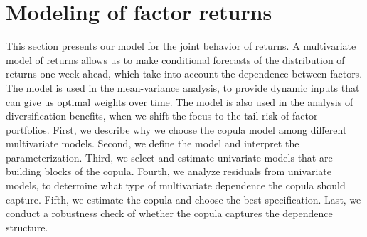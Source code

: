 
\section{Modeling of factor returns} %
\label{sec:modeling_of_factor_returns}

This section presents our model for the joint behavior of returns. A multivariate model of returns allows us to make conditional forecasts of the distribution of returns one week ahead, which take into account the dependence between factors. The model is used in the mean-variance analysis, to provide dynamic inputs that can give us optimal weights over time. The model is also used in the analysis of diversification benefits, when we shift the focus to the tail risk of factor portfolios. First, we describe why we choose the copula model among different multivariate models. Second, we define the model and interpret the parameterization. Third, we select and estimate univariate models that are building blocks of the copula. Fourth, we analyze residuals from univariate models, to determine what type of multivariate dependence the copula should capture. Fifth, we estimate the copula and choose the best specification. Last, we conduct a robustness check of whether the copula captures the dependence structure.







